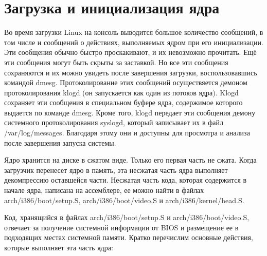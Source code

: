 \section{Загрузка и инициализация ядра}

Во время загрузки Linux на консоль выводится большое количество сообщений, в том числе и сообщений о действиях, выполняемых ядром при его инициализации. Эти сообщения обычно быстро проскакивают, и их невозможно прочитать. Ещё эти сообщения могут быть скрыты за заставкой. Но все эти сообщения сохраняются и их можно увидеть после завершения загрузки, воспользовавшись командой dmesg. Протоколирование этих сообщений осуществяется демоном протоколирования klogd (он запускается как один из потоков ядра). Klogd сохраняет эти сообщения в специальном буфере ядра, содержимое которого выдается по команде dmesg. Кроме того, klogd передает эти сообщения демону системного протоколирования syslogd, который записывает их в файл /var/log/messages. Благодаря этому они и доступны для просмотра и анализа после завершения запуска системы.

Ядро хранится на диске в сжатом виде. Только его первая часть не сжата. Когда загрузчик перенесет ядро в память, эта несжатая часть ядра выполняет декомпрессию оставшейся части. Несжатая часть кода, которая содержится в начале ядра, написана на ассемблере, ее можно найти в файлах arch/i386/boot/setup.S, arch/i386/boot/video.S и arch/i386/kernel/head.S.

Код, хранящийся в файлах arch/i386/boot/setup.S и arch/i386/boot/video.S, отвечает за получение системной информации от BIOS и размещение ее в подходящих местах системной памяти. Кратко перечислим основные действия, которые выполняет эта часть ядра:

